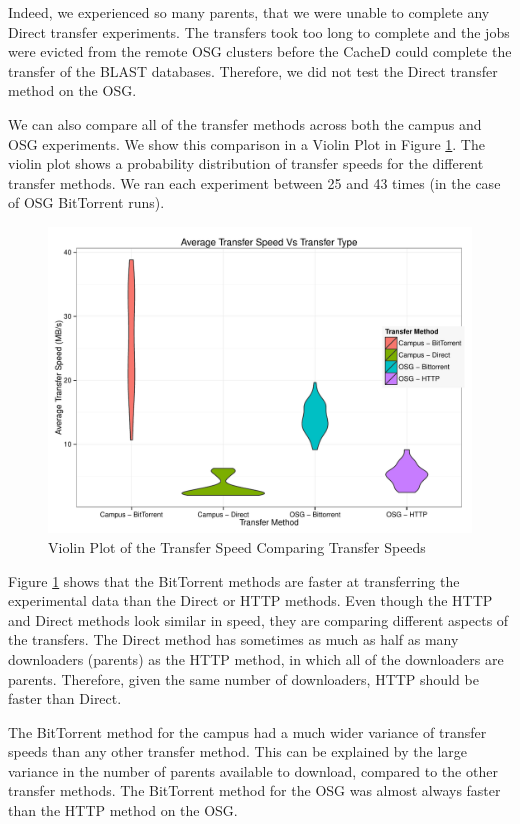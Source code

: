 Indeed, we experienced so many parents, that we were unable to complete any Direct transfer experiments.  The transfers took too long to complete and the jobs were evicted from the remote OSG clusters before the CacheD could complete the transfer of the BLAST databases.  Therefore, we did not test the Direct transfer method on the OSG.

We can also compare all of the transfer methods across both the campus and OSG experiments.  We show this comparison in a Violin Plot \cite{hintze1998violin} in Figure \ref{fig:violinplots}.  The violin plot shows a probability distribution of transfer speeds for the different transfer methods.  We ran each experiment between 25 and 43 times (in the case of OSG BitTorrent runs).

\begin{figure}[h!t]
\includegraphics[width=\textwidth]{images/ViolinPlot.pdf}
\caption{Violin Plot of the Transfer Speed Comparing Transfer Speeds}
\label{fig:violinplots}
\end{figure}

Figure \ref{fig:violinplots} shows that the BitTorrent methods are faster at transferring the experimental data than the Direct or HTTP methods.  Even though the HTTP and Direct methods look similar in speed, they are comparing different aspects of the transfers.  The Direct method has sometimes as much as half as many downloaders (parents) as the HTTP method, in which all of the downloaders are parents.  Therefore, given the same number of downloaders, HTTP should be faster than Direct.

The BitTorrent method for the campus had a much wider variance of transfer speeds than any other transfer method.  This can be explained by the large variance in the number of parents available to download, compared to the other transfer methods.  The BitTorrent method for the OSG was almost always faster than the HTTP method on the OSG.

